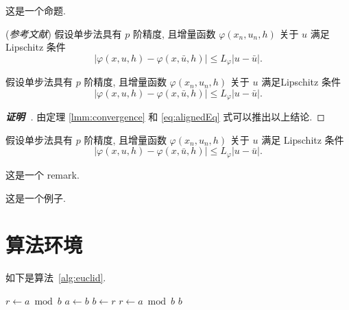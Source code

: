 \begin{proposition}[Proposition]
这是一个命题.
\end{proposition}

\begin{lemma}\label{lmm:convergence} {\upshape (\textit{参考文献}\cite{LiLiu1997})}
假设单步法具有 $p$ 阶精度, 且增量函数 $\varphi(x_{n}, u_{n}, h)$ 关于 $u$ 满足 \textup{Lipschitz} 条件
\begin{equation}\label{eq:conver1}
|\varphi(x, u, h)-\varphi(x, \bar{u}, h)| \leqslant L_{\varphi}|u-\bar{u}|.
\end{equation}
\end{lemma}

\begin{theorem}\label{thm:convergence}
假设单步法具有 $p$ 阶精度, 且增量函数 $\varphi(x_{n}, u_{n}, h)$ 关于 $u$ 满足\textup{Lipschitz} 条件
\begin{equation}\label{eq:conver2}
|\varphi(x, u, h)-\varphi(x, \bar{u}, h)| \leqslant L_{\varphi}|u-\bar{u}|.
\end{equation}
\end{theorem}
\begin{proof}[\normalfont\bfseries 证明~\nopunct]
由定理 \ref{lmm:convergence} 和 \eqref{eq:alignedEq} 式可以推出以上结论.
\end{proof}

\begin{corollary}\label{col:convergence}
假设单步法具有 $p$ 阶精度, 且增量函数 $\varphi(x_{n}, u_{n}, h)$ 关于 $u$ 满足 \textup{Lipschitz} 条件
\begin{equation}\label{eq:conver3}
|\varphi(x, u, h)-\varphi(x, \bar{u}, h)| \leqslant L_{\varphi}|u-\bar{u}|.
\end{equation}
\end{corollary}

\begin{remark}\label{rem:remark}
这是一个 remark.
\end{remark}

\begin{example}
这是一个例子.
\end{example}


\clearpage
\section{算法环境}

如下是算法~\ref{alg:euclid}.
\begin{algorithm}[H]
\small
\caption{~Euclid's algorithm}\label{alg:euclid}
\begin{algorithmic}[1]
  \State $r\gets a\bmod b$
  \State $a\gets b$
  \State $b\gets r$
  \State $r\gets a\bmod b$
  \EndWhile\label{euclidendwhile}
  \State \Return $b$
  \EndProcedure
\end{algorithmic}
\end{algorithm}


